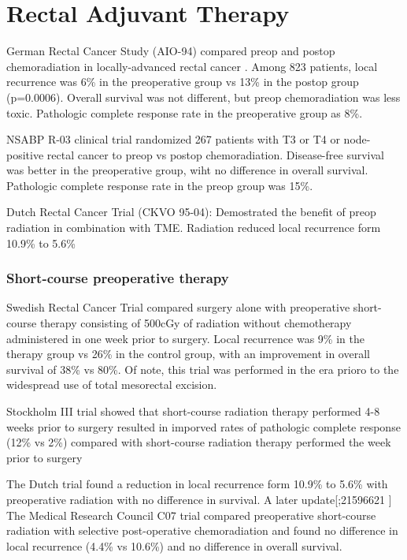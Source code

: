 \documentclass[
]{book}
\begin{document}
\hypertarget{rectal-adjuvant-therapy}{%
\chapter{Rectal Adjuvant Therapy}\label{rectal-adjuvant-therapy}}

German Rectal Cancer Study (AIO-94) compared preop and postop chemoradiation in locally-advanced rectal cancer \citep{sauer173}. Among 823 patients, local recurrence was 6\% in the preoperative group vs 13\% in the postop group (p=0.0006). Overall survival was not different, but preop chemoradiation was less toxic. Pathologic complete response rate in the preoperative group as 8\%.

NSABP R-03 clinical trial \citep{roh5124} randomized 267 patients with T3 or T4 or node-positive rectal cancer to preop vs postop chemoradiation. Disease-free survival was better in the preoperative group, wiht no difference in overall survival. Pathologic complete response rate in the preop group was 15\%.

Dutch Rectal Cancer Trial (CKVO 95-04): Demostrated the benefit of preop radiation in combination with TME\citep{kapiteijn638}. Radiation reduced local recurrence form 10.9\% to 5.6\%

\hypertarget{short-course-preoperative-therapy}{%
\subsection{Short-course preoperative therapy}\label{short-course-preoperative-therapy}}

Swedish Rectal Cancer Trial compared surgery alone with preoperative short-course therapy consisting of 500cGy of radiation without chemotherapy administered in one week prior to surgery. Local recurrence was 9\% in the therapy group vs 26\% in the control group, with an improvement in overall survival of 38\% vs 80\%\citep{swedishrectalcancertrial980}. Of note, this trial was performed in the era prioro to the widespread use of total mesorectal excision.

Stockholm III trial showed that short-course radiation therapy performed 4-8 weeks prior to surgery resulted in imporved rates of pathologic complete response (12\% vs 2\%) compared with short-course radiation therapy performed the week prior to surgery \citep{pettersson972}

The Dutch trial found a reduction in local recurrence form 10.9\% to 5.6\% with preoperative radiation with no difference in survival\citep{kapiteijn638}. A later update{[}\citet{575};21596621 {]} The Medical Research Council C07 trial compared preoperative short-course radiation with selective post-operative chemoradiation and found no difference in local recurrence (4.4\% vs 10.6\%) and no difference in overall survival.\citep{sebag-montefiore811}
\end{document}
